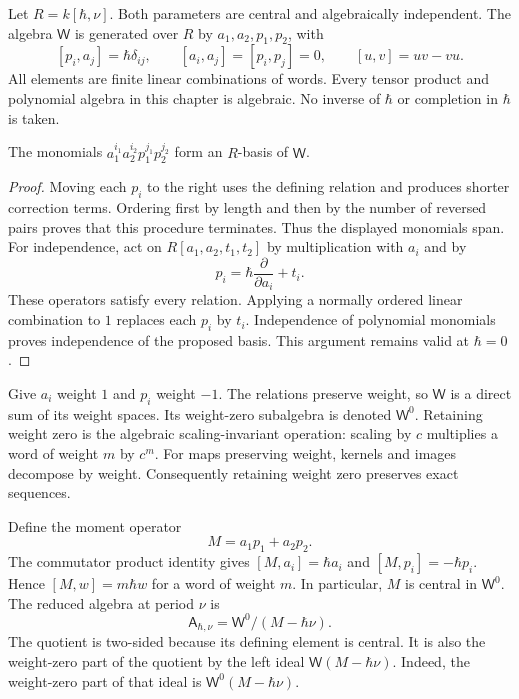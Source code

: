 Let $R=k[\hbar,\nu]$.
Both parameters are central and algebraically independent.
The algebra $\mathsf W$ is generated over $R$ by $a_1,a_2,p_1,p_2$, with
\[
 [p_i,a_j]=\hbar\delta_{ij},\qquad [a_i,a_j]=[p_i,p_j]=0,
 \qquad [u,v]=uv-vu.
\]
All elements are finite linear combinations of words.
Every tensor product and polynomial algebra in this chapter is algebraic.
No inverse of $\hbar$ or completion in $\hbar$ is taken.

\begin{lemma}\label{lem:qc-weyl-basis}
The monomials $a_1^{i_1}a_2^{i_2}p_1^{j_1}p_2^{j_2}$ form an $R$-basis of $\mathsf W$.
\end{lemma}
\begin{proof}
Moving each $p_i$ to the right uses the defining relation and produces shorter correction terms.
Ordering first by length and then by the number of reversed pairs proves that this procedure terminates.
Thus the displayed monomials span.
For independence, act on $R[a_1,a_2,t_1,t_2]$ by multiplication with $a_i$ and by
\[
 p_i=\hbar\frac{\partial}{\partial a_i}+t_i.
\]
These operators satisfy every relation.
Applying a normally ordered linear combination to $1$ replaces each $p_i$ by $t_i$.
Independence of polynomial monomials proves independence of the proposed basis.
This argument remains valid at $\hbar=0$.
\end{proof}

Give $a_i$ weight $1$ and $p_i$ weight $-1$.
The relations preserve weight, so $\mathsf W$ is a direct sum of its weight spaces.
Its weight-zero subalgebra is denoted $\mathsf W^0$.
Retaining weight zero is the algebraic scaling-invariant operation: scaling by $c$ multiplies a word of weight $m$ by $c^m$.
For maps preserving weight, kernels and images decompose by weight.
Consequently retaining weight zero preserves exact sequences.

Define the moment operator
\[
 M=a_1p_1+a_2p_2.
\]
The commutator product identity gives $[M,a_i]=\hbar a_i$ and $[M,p_i]=-\hbar p_i$.
Hence $[M,w]=m\hbar w$ for a word of weight $m$.
In particular, $M$ is central in $\mathsf W^0$.
The reduced algebra at period $\nu$ is
\begin{equation}\label{eq:qc-reduction}
 \mathsf A_{\hbar,\nu}=\mathsf W^0/(M-\hbar\nu).
\end{equation}
The quotient is two-sided because its defining element is central.
It is also the weight-zero part of the quotient by the left ideal $\mathsf W(M-\hbar\nu)$.
Indeed, the weight-zero part of that ideal is $\mathsf W^0(M-\hbar\nu)$.

